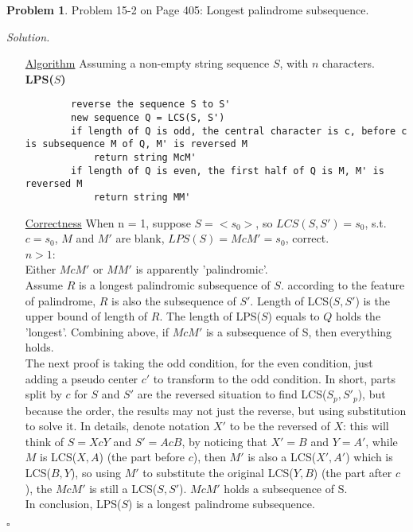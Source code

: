 \documentclass[11pt]{article}
\theoremstyle{definition}
\newtheorem{problem}{Problem}
\newenvironment{solution}{\noindent\emph{Solution.}}{\hfill$\square$}
\newcommand\tab[1][1cm]{\hspace*{#1}}
\begin{document}
\newpage



\begin{problem}
Problem 15-2 on Page 405: Longest palindrome subsequence.
\end{problem}

\begin{solution}
\begin{enumerate}

    \item[\underline{Algorithm}]
Assuming a non-empty string sequence $S$, with $n$ characters.\\
\textbf{LPS($S$)}
\begin{lstlisting}
		reverse the sequence S to S'
		new sequence Q = LCS(S, S')
		if length of Q is odd, the central character is c, before c is subsequence M of Q, M' is reversed M
			return string McM'
		if length of Q is even, the first half of Q is M, M' is reversed M
			return string MM'
\end{lstlisting}

 \item[\underline{Correctness}] When n = 1, suppose $S = <s_0>$, so $LCS(S, S') = s_0$, s.t. $c = s_0$, $M$ and $M'$ are blank, $LPS(S) = McM' = s_0$, correct.\\
$n>1$:\\
\tab Either $McM'$ or $MM'$ is apparently 'palindromic'. \\
\tab Assume $R$ is a longest palindromic subsequence of $S$. according to the feature of palindrome, $R$ is also the subsequence of $S'$. Length of LCS($S, S'$) is the upper bound of length of $R$. The length of LPS($S$) equals to $Q$ holds the 'longest'. Combining above, if $McM'$ is a subsequence of S, then everything holds.\\
\tab The next proof is taking the odd condition, for the even condition, just adding a pseudo center $c'$ to transform to the odd condition. In short, parts split by $c$ for $S$  and $S'$ are the reversed situation to find LCS($S_p, S'_p$), but because the order, the results may not just the reverse, but using substitution to solve it. In details, denote notation $X'$ to be the reversed of $X$: this will think of $S = XcY$ and $S' = AcB$, by noticing that $X' = B$ and $Y = A'$, while $M$ is LCS($X, A$) (the part before $c$), then $M'$ is also a LCS($X', A'$) which is LCS($B, Y$), so using $M'$ to substitute the original LCS($Y, B$) (the part after $c$), the $McM'$ is still a LCS($S, S'$). $McM'$ holds a subsequence of S.\\
\tab In conclusion, LPS($S$) is a longest palindrome subsequence.


\end{enumerate}
\end{solution}
\end{document}
